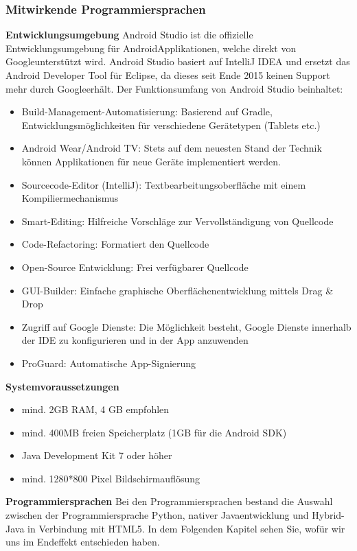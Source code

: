 \subsubsection{Mitwirkende Programmiersprachen}
\label{subsec:androidsprachen}
\textbf{Entwicklungsumgebung\newline}
Android Studio ist die offizielle Entwicklungsumgebung für Android\texttrademark Applikationen, welche direkt von Google\texttrademark unterstützt wird.
Android Studio basiert auf IntelliJ IDEA und ersetzt das Android Developer Tool für Eclipse, da dieses seit Ende 2015 keinen Support mehr durch Google\texttrademark erhält. Der Funktionsumfang von Android Studio beinhaltet:
\begin{itemize}
	\item Build-Management-Automatisierung: Basierend auf Gradle, Entwicklungsmöglichkeiten für verschiedene Gerätetypen (Tablets etc.)
	\item Android Wear/Android TV: Stets auf dem neuesten Stand der Technik können Applikationen für neue Geräte implementiert werden.
	\item Sourcecode-Editor (IntelliJ): Textbearbeitungsoberfläche mit einem Kompiliermechanismus
	\item Smart-Editing: Hilfreiche Vorschläge zur Vervollständigung von Quellcode
	\item Code-Refactoring: Formatiert den Quellcode
	\item Open-Source Entwicklung: Frei verfügbarer Quellcode
	\item GUI-Builder: Einfache graphische Oberflächenentwicklung mittels Drag \& Drop
	\item Zugriff auf Google Dienste: Die Möglichkeit besteht, Google Dienste innerhalb der IDE zu konfigurieren und in der App anzuwenden
	\item ProGuard: Automatische App-Signierung
\end{itemize}

\textbf{Systemvoraussetzungen\newline}
\begin{itemize}
	\item mind. 2GB RAM, 4 GB empfohlen
	\item mind. 400MB freien Speicherplatz (1GB für die Android SDK)
	\item Java Development Kit 7 oder höher
	\item mind. 1280*800 Pixel Bildschirmauflösung
\end{itemize}
\textbf{Programmiersprachen\newline}
Bei den Programmiersprachen bestand die Auswahl zwischen der Programmiersprache Python, 
nativer Javaentwicklung und Hybrid-Java in Verbindung mit HTML5. In dem Folgenden Kapitel
sehen Sie, wofür wir uns im Endeffekt entschieden haben.



